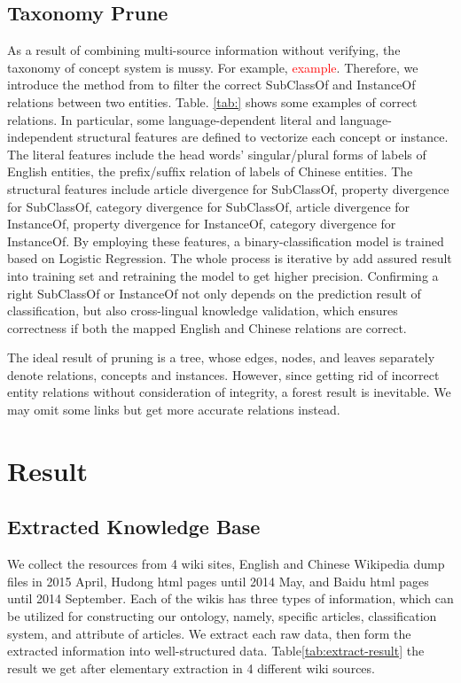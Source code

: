 \documentclass[runningheads,a4paper]{llncs}
\begin{document}
\subsection{Taxonomy Prune}
\label{sec:tp}
As a result of combining multi-source information without verifying, the taxonomy of concept system is mussy. For example, \textcolor{red}{example}. Therefore, we introduce the method from\cite{wang2014cross} to filter the correct SubClassOf and InstanceOf relations between two entities. Table. \ref{tab:} shows some examples of correct relations. In particular, some language-dependent literal and language-independent structural features are defined to vectorize each concept or instance. The literal features include the head words’ singular/plural forms of labels of English entities, the preﬁx/sufﬁx relation of labels of Chinese entities. The structural features include article divergence for SubClassOf, property divergence for SubClassOf, category divergence for SubClassOf, article divergence for InstanceOf, property divergence for InstanceOf, category divergence for InstanceOf. By employing these features, a binary-classification model is trained based on Logistic Regression. The whole process is iterative by add assured result into training set and retraining the model to get higher precision. Confirming a right SubClassOf or InstanceOf not only depends on the prediction result of classification, but also cross-lingual knowledge validation, which ensures correctness if both the mapped English and Chinese relations are correct. 

The ideal result of pruning is a tree, whose edges, nodes, and leaves separately denote relations, concepts and instances. However, since getting rid of incorrect entity relations without consideration of integrity, a forest result is inevitable. We may omit some links but get more accurate relations instead.

\section{Result}
\label{sec:result}

\subsection{Extracted Knowledge Base}
We collect the resources from 4 wiki sites, English and Chinese Wikipedia dump files in 2015 April, Hudong html pages until 2014 May, and Baidu html pages until 2014 September. Each of the wikis has three types of information, which can be utilized for constructing our ontology, namely, specific articles, classification system, and attribute of articles. We extract each raw data, then form the extracted information into well-structured data. Table\ref{tab:extract-result} the result we get after elementary extraction in 4 different wiki sources.
\end{document}
